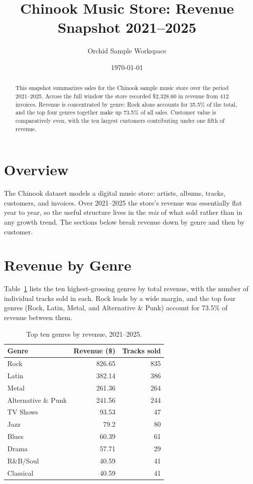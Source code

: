 \documentclass[11pt]{article}
\title{Chinook Music Store: Revenue Snapshot 2021--2025}
\author{Orchid Sample Workspace}
\date{\today}
\begin{document}
\maketitle

\begin{abstract}
This snapshot summarizes sales for the Chinook sample music store over the period
2021--2025. Across the full window the store recorded \$2{,}328.60 in revenue from
412 invoices. Revenue is concentrated by genre: Rock alone accounts for 35.5\% of the
total, and the top four genres together make up 73.5\% of all sales. Customer value is
comparatively even, with the ten largest customers contributing under one fifth of revenue.
\end{abstract}

\section{Overview}
The Chinook dataset models a digital music store: artists, albums, tracks, customers, and
invoices. Over 2021--2025 the store's revenue was essentially flat year to year, so the
useful structure lives in the \emph{mix} of what sold rather than in any growth trend. The
sections below break revenue down by genre and then by customer.

\section{Revenue by Genre}
Table~\ref{tab:genre} lists the ten highest-grossing genres by total revenue, with the number
of individual tracks sold in each. Rock leads by a wide margin, and the top four genres
(Rock, Latin, Metal, and Alternative \& Punk) account for 73.5\% of revenue between them.

\begin{table}[h]
\centering
\begin{tabular}{lrr}
\hline
\textbf{Genre} & \textbf{Revenue (\$)} & \textbf{Tracks sold} \\
\hline
Rock & 826.65 & 835 \\
Latin & 382.14 & 386 \\
Metal & 261.36 & 264 \\
Alternative \& Punk & 241.56 & 244 \\
TV Shows & 93.53 & 47 \\
Jazz & 79.2 & 80 \\
Blues & 60.39 & 61 \\
Drama & 57.71 & 29 \\
R\&B/Soul & 40.59 & 41 \\
Classical & 40.59 & 41 \\
\hline
\end{tabular}
\caption{Top ten genres by revenue, 2021--2025.}
\label{tab:genre}
\end{table}
\end{document}
